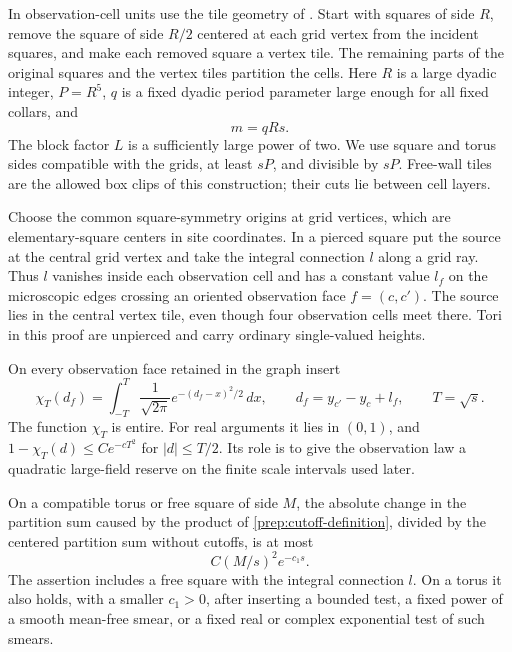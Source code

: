 In observation-cell units use the tile geometry of
\cite[Theorem 9.1 and Subsection 9.2]{B}.
Start with squares of side $R$, remove the square of side $R/2$ centered
at each grid vertex from the incident squares, and make each removed
square a vertex tile.  The remaining parts of the original squares and
the vertex tiles partition the cells.  Here $R$ is a large dyadic integer,
$P=R^5$, $q$ is a fixed dyadic period parameter large enough for all fixed
collars, and
\begin{equation}\label{prep:scales}
                         m=qRs.
\end{equation}
The block factor $L$ is a sufficiently large power of two.  We use square
and torus sides compatible with the grids, at least $sP$, and divisible by
$sP$.  Free-wall tiles are the allowed box clips of this construction;
their cuts lie between cell layers.

Choose the common square-symmetry origins at grid vertices, which are
elementary-square centers in site coordinates.  In a pierced square put
the source at the central grid vertex and take the integral connection
$l$ along a grid ray.  Thus $l$ vanishes inside each observation cell and
has a constant value $l_f$ on the microscopic edges crossing an oriented
observation face $f=(c,c')$.  The source lies in the central vertex tile,
even though four observation cells meet there.  Tori in this proof are
unpierced and carry ordinary single-valued heights.

On every observation face retained in the graph insert
\begin{equation}\label{prep:cutoff-definition}
 \chi_T(d_f)=\int_{-T}^{T}\frac{1}{\sqrt{2\pi}}
                   e^{-(d_f-x)^2/2}\,dx,
 \qquad d_f=y_{c'}-y_c+l_f,\qquad T=\sqrt{s}.
\end{equation}
The function $\chi_T$ is entire.  For real arguments it lies in $(0,1)$,
and $1-\chi_T(d)\le C e^{-cT^2}$ for $|d|\le T/2$.  Its role is to give
the observation law a quadratic large-field reserve on the finite scale
intervals used later.

\begin{lemma}\label{prep:cutoff}
On a compatible torus or free square of side $M$, the absolute change in
the partition sum caused by the product of
\eqref{prep:cutoff-definition}, divided by the centered partition
sum without cutoffs,
is at most
\begin{equation}\label{eq:cutoff-error}
                         C(M/s)^2 e^{-c_1s}.
\end{equation}
The assertion includes a free square with the integral connection $l$.
On a torus it also holds, with a smaller $c_1>0$, after inserting a
bounded test, a fixed power of a smooth mean-free smear, or a fixed real
or complex exponential test of such smears.
\end{lemma}

